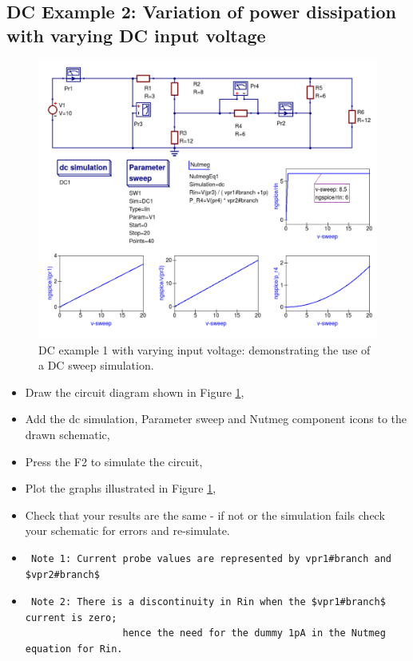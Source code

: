 \documentclass[10pt, a4paper]{report}
\begin{document}
\subsection{ DC Example 2: Variation of power dissipation with varying DC input voltage}
\begin{figure}[ht]
	\centering
	\includegraphics[width=15cm]{pics/chap2/DC_EX2.pdf}
	\caption{DC example 1 with varying input voltage: demonstrating the use of a DC sweep simulation. }
	\label{Fig21}
\end{figure}
\begin{itemize}
	\item {Draw the circuit diagram shown in Figure \ref{Fig21},}
	\item {Add the dc simulation, Parameter sweep and Nutmeg component icons to the drawn schematic,}
	\item {Press the F2 to simulate the circuit, }
	\item {Plot the graphs illustrated in Figure \ref{Fig21}, }
	\item{Check that your results are the same - if not or the simulation fails check your schematic for errors and re-simulate.}
	\item {\begin{verbatim} Note 1: Current probe values are represented by vpr1#branch and $vpr2#branch$ \end{verbatim} }
		\item {\begin{verbatim} Note 2: There is a discontinuity in Rin when the $vpr1#branch$ current is zero;
				 hence the need for the dummy 1pA in the Nutmeg equation for Rin.\end{verbatim} }	
	\end{itemize}
\end{document}
